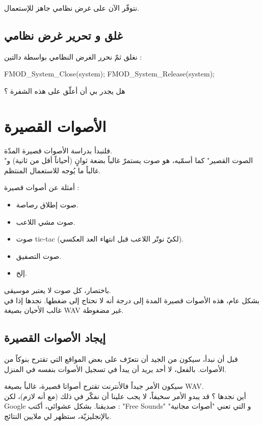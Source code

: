 نتوفّر الآن على غرض نظامي جاهز للإستعمال.

\subsection{غلق و تحرير غرض نظامي}

نغلق ثمّ نحرر الغرض النظامي بواسطة دالتين :

\begin{Csource}
FMOD_System_Close(system);
FMOD_System_Release(system);
\end{Csource}

هل يجدر بي أن أعلّق على هذه الشفرة ؟

\section{الأصوات القصيرة}

فلنبدأ بدراسة الأصوات قصيرة المدّة.\\
"الصوت القصير"  كما أسمّيه، هو صوت يستمرّ غالباً بضعة ثوانٍ (أحياناً أقل من ثانية) و غالباً ما يُوجه للاستعمال المنتظم.

أمثلة عن أصوات قصيرة :

\begin{itemize}
	\item صوت إطلاق رصاصة.
	\item صوت مشي اللاعب.
	\item صوت 
	\textenglish{tic-tac}
	(لكيّ نوتّر اللاعب قبل انتهاء العد العكسي).
	\item صوت التصفيق.
	\item إلخ.
\end{itemize}

باختصار، كل صوت لا يعتبر موسيقى.\\
بشكل عام، هذه الأصوات قصيرة المدة إلى درجة أنه لا نحتاج إلى ضغطها. نجدها إذا في غالب الأحيان بصيغة
\textenglish{WAV}
غير مضغوطة.

\subsection{إيجاد الأصوات القصيرة}

 قبل أن نبدأ، سيكون من الجيد أن نتعرّف على بعض المواقع التي تقترح بنوكاً من الأصوات. بالفعل، لا أحد يريد أن يبدأ في تسجيل الأصوات بنفسه في المنزل.
 
سيكون الأمر جيداً فالأنترنت تقترح أصواتا قصيرة، غالباً بصيغة 
\textenglish{WAV}.\\
أين نجدها ؟ قد يبدو الأمر سخيفاً، لا يجب علينا أن نفكّر في ذلك (مع أنه لازم)، لكن
\textenglish{Google}
صديقنا. بشكل عشوائي، أكتب : 
"\textenglish{Free Sounds}"
و التي تعني "أصوات مجانية" بالإنجليزيّة، ستظهر لي ملايين النتائج.

